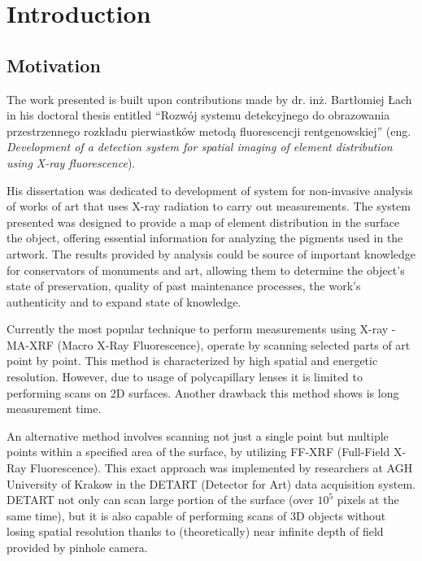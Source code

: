 \section{Introduction}
\subsection{Motivation}
The work presented is built upon contributions made by dr. inż. Bartłomiej Łach in his doctoral thesis entitled ``Rozwój systemu detekcyjnego do obrazowania przestrzennego rozkładu pierwiastków metodą fluorescencji rentgenowskiej'' \cite{Lach2022}  (eng. \emph{Development of a detection system for spatial imaging of element distribution using X-ray fluorescence}).

His dissertation was dedicated to development of system for non-invasive analysis of works of art that uses X-ray radiation to carry out measurements. 
The system presented was designed to provide a map of element distribution in the surface the object, offering essential information for analyzing the pigments used in the artwork. 
The results provided by analysis could be source of important knowledge for conservators of monuments and art, allowing them to determine the object's state of preservation, quality of past maintenance processes, the work's authenticity and to expand state of knowledge.

Currently the most popular technique to perform measurements using X-ray - MA-XRF (Macro X-Ray Fluorescence), operate by scanning selected parts of art point by point. 
This method is characterized by high spatial and energetic resolution. 
However, due to usage of polycapillary lenses it is limited to performing scans on 2D surfaces.
Another drawback this method shows is long measurement time. 

An alternative method involves scanning not just a single point but multiple points within a specified area of the surface, by utilizing FF-XRF (Full-Field X-Ray Fluorescence). 
This exact approach was implemented by researchers at AGH University of Krakow in the DETART (Detector for Art) data acquisition system. 
DETART not only can scan large portion of the surface (over $10^5$ pixels at the same time), but it is also capable of performing scans of 3D objects without losing spatial resolution thanks to (theoretically) near infinite depth of field provided by pinhole camera. 

